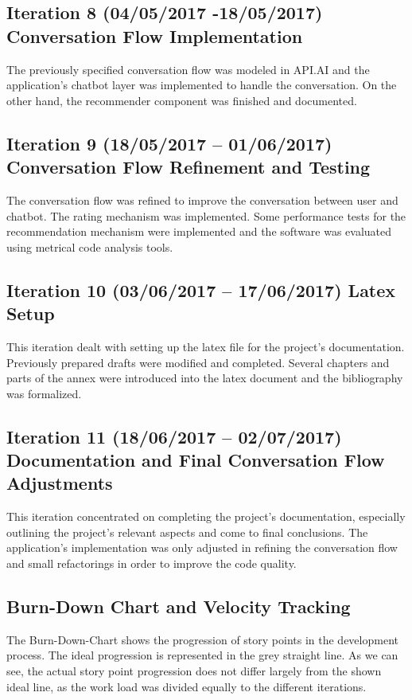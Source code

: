 \subsection{Iteration 8 (04/05/2017 -18/05/2017) Conversation Flow Implementation}
The previously specified conversation flow was modeled in API.AI and the application's chatbot layer was implemented to handle the conversation. On the other hand, the recommender component was finished and documented.

\subsection{Iteration 9 (18/05/2017 – 01/06/2017) Conversation Flow Refinement and Testing}
The conversation flow was refined to improve the conversation between user and chatbot. The rating mechanism was implemented. Some performance tests for the recommendation mechanism were implemented and the software was evaluated using metrical code analysis tools.

\subsection{Iteration 10 (03/06/2017 – 17/06/2017) Latex Setup}
This iteration dealt with setting up the latex file for the project’s documentation. Previously prepared drafts were modified and completed. Several chapters and parts of the annex were introduced into the latex document and the bibliography was formalized.

\subsection{Iteration 11 (18/06/2017 – 02/07/2017) Documentation and Final Conversation Flow Adjustments}
This iteration concentrated on completing the project's documentation, especially outlining the project's relevant aspects and come to final conclusions. The application's implementation was only adjusted in refining the conversation flow and small refactorings in order to improve the code quality.

\subsection{Burn-Down Chart and Velocity Tracking}

The Burn-Down-Chart shows the progression of story points in the development process. The ideal progression is represented in the grey straight line. As we can see, the actual story point progression does not differ largely from the shown ideal line, as the work load was divided equally to the different iterations. 

